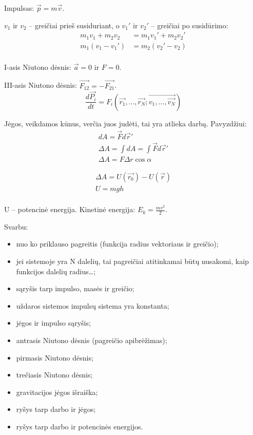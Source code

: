 Impulsas: $\vec{p} = m\vec{v}$.


$v_{1}$ ir $v_{2}$ – greičiai prieš susiduriant, o
$v_{1}'$ ir $v_{2}'$ – greičiai po susidūrimo:
\begin{align*}
  m_{1}v_{1} + m_{2}v_{2} &= m_{1}v_{1}' + m_{2}v_{2}' \\
  m_{1}(v_{1}-v_{1}') &= m_{2}(v_{2}' - v_{2}) \\
\end{align*}

I-asis Niutono dėsnis: $\vec{a} = 0$ ir $F = 0$.

III-asis Niutono dėsnis: $\vec{F_{12}} = - \vec{F_{21}}$.
\begin{equation*}
  \frac{d\vec{P_{i}}}{dt}
  = F_{i} (\vec{r_{1}},\ldots,\vec{r_{N}}; \vec{v_{1},\ldots,\vec{v_{N}}})
\end{equation*}

Jėgos, veikdamos kūnus, verčia juos judėti, tai yra atlieka darbą.
Pavyzdžiui:
\begin{align*}
  dA = \vec{F}d\vec{r}'\\
  \Delta A = \int dA = \int \vec{F}d\vec{r}' \\
  \Delta A= F \Delta r \cos \alpha
\end{align*}


\begin{align*}
  \Delta A = U(\vec{r_{0}}) - U(\vec{r}) \\
  U = mgh \\
\end{align*}

U – potencinė energija. Kinetinė energija: $E_{k} = \frac{mv^{2}}{2}$.

Svarbu:
\begin{itemize}
  \item nuo ko priklauso pagreitis (funkcija radius vektoriaus ir greičio);
  \item jei sistemoje yra N dalelių, tai pagreičiai atitinkamai būtų
    nusakomi, kaip funkcijos dalelių radius…;
  \item sąryšis tarp impulso, masės ir greičio;
  \item uždaros sistemos impulsų sistema yra konstanta;
  \item jėgos ir impulso sąryšis;
  \item antrasis Niutono dėsnis (pagreičio apibrėžimas);
  \item pirmasis Niutono dėsnis;
  \item trečiasis Niutono dėsnis;
  \item gravitacijos jėgos išraiška;
  \item ryšys tarp darbo ir jėgos;
  \item ryšys tarp darbo ir potencinės energijos.
\end{itemize}

